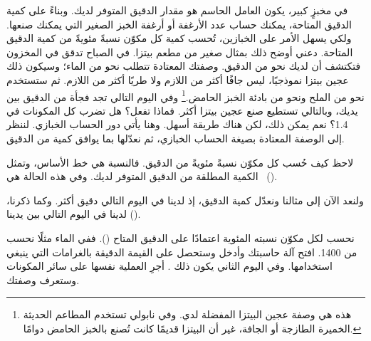 في مخبزٍ كبير، يكون العامل الحاسم هو مقدار الدقيق المتوفر لديك. وبناءً على كمية الدقيق المتاحة، يمكنك حساب عدد الأرغفة أو أرغفة الخبز الصغير التي يمكنك صنعها. ولكي يسهل الأمر على الخبازين، تُحسب كمية كل مكوّن نسبةً مئويةً من كمية الدقيق المتاحة. دعني أوضح ذلك بمثال صغير من مطعم بيتزا. في الصباح تدقق في المخزون فتكتشف أن لديك نحو  من الدقيق. وصفتك المعتادة تتطلب نحو  من الماء؛ وسيكون ذلك عجين بيتزا نموذجيًا، ليس جافًا أكثر من اللازم ولا طريًا أكثر من اللازم. ثم ستستخدم نحو  من الملح ونحو  من بادئة الخبز الحامض.\footnote{هذه هي وصفة عجين البيتزا المفضلة لدي. وفي نابولي تستخدم المطاعم الحديثة الخميرة الطازجة أو الجافة، غير أن البيتزا قديمًا كانت تُصنع بالخبز الحامض دوامًا.} وفي اليوم التالي تجد فجأة  من الدقيق بين يديك، وبالتالي تستطيع صنع عجين بيتزا أكثر. فماذا تفعل؟ هل تضرب كل المكونات في \num{1.4}؟ نعم يمكن ذلك، لكن هناك طريقة أسهل. وهنا يأتي دور الحساب الخبازي. لننظر إلى الوصفة المعتادة بصيغة الحساب الخبازي، ثم نعدّلها بما يوافق كمية  من الدقيق.

\begin{table}[!htb]
\centering
  
  \caption[مثال على الحساب الخبازي]{جدول مثال يوضح كيفية الحساب الصحيح باستخدام الحساب الخبازي.}
\end{table}

لاحظ كيف حُسب كل مكوّن نسبةً مئويةً من الدقيق. فالنسبة  هي خط الأساس، وتمثل الكمية المطلقة من الدقيق المتوفر لديك. وفي هذه الحالة هي ~().

ولنعد الآن إلى مثالنا ونعدّل كمية الدقيق، إذ لدينا في اليوم التالي دقيق أكثر. وكما ذكرنا، لدينا في اليوم التالي  بين يدينا ().

\begin{table}[!htb]
    \centering
        
        \caption[مثال آخر على الحساب الخبازي]{وصفة مثال تعتمد  خطَّ أساس لها، ثم تُحسب باستخدام الحساب الخبازي.}
\end{table}

نحسب لكل مكوّن نسبته المئوية اعتمادًا على الدقيق المتاح (). ففي الماء مثلًا نحسب  من \num{1400}. افتح آلة حاسبتك وأدخل  وستحصل على القيمة الدقيقة بالغرامات التي ينبغي استخدامها. وفي اليوم الثاني يكون ذلك . أجرِ العملية نفسها على سائر المكونات وستعرف وصفتك.

